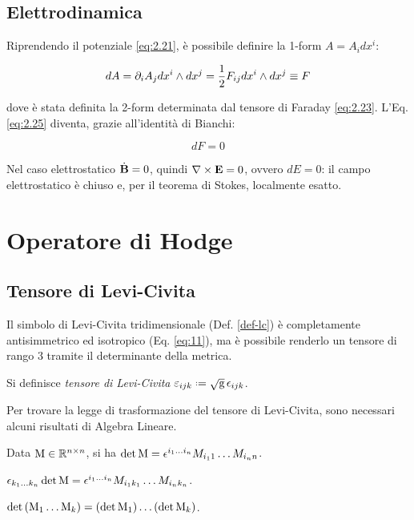 \subsection{Elettrodinamica}

Riprendendo il potenziale \ref{eq:2.21}, è possibile definire la 1-form $ A = A_i dx^i $:

\begin{equation}
	dA = \partial_i A_j dx^i \wedge dx^j = \frac{1}{2} F_{ij} dx^i \wedge dx^j \equiv F
	\label{eq:3.13}
\end{equation}

dove è stata definita la 2-form determinata dal tensore di Faraday \ref{eq:2.23}. L'Eq. \ref{eq:2.25} diventa, grazie all'identità di Bianchi:

\begin{equation}
	dF = 0
	\label{eq:3.14}
\end{equation}

Nel caso elettrostatico $ \dot{\mathbf{B}} = 0 $, quindi $ \nabla\times\mathbf{E} = 0 $, ovvero $ dE = 0 $: il campo elettrostatico è chiuso e, per il teorema di Stokes, localmente esatto.

\section{Operatore di Hodge}

\subsection{Tensore di Levi-Civita}

Il simbolo di Levi-Civita tridimensionale (Def. \ref{def-lc}) è completamente antisimmetrico ed isotropico (Eq. \ref{eq:11}), ma è possibile renderlo un tensore di rango 3 tramite il determinante della metrica.

\begin{definition}
	Si definisce \textit{tensore di Levi-Civita} $ \varepsilon_{ijk} \defeq \sqg \,\epsilon_{ijk} $.
\end{definition}

Per trovare la legge di trasformazione del tensore di Levi-Civita, sono necessari alcuni risultati di Algebra Lineare.

\begin{theorem}[di Laplace]
	Data $ \mathbf{\text{M}}\in\mathbb{R}^{n\times n} $, si ha $ \det\mathbf{\text{M}} = \epsilon^{i_1 \dots i_n} M_{i_1 1} \dots M_{i_n n} $.
\end{theorem}
\begin{corollary}
	$ \epsilon_{k_1 \dots k_n} \det\mathbf{\text{M}} = \epsilon^{i_1 \dots i_n} M_{i_1 k_1} \dots M_{i_n k_n} $.
\end{corollary}
\begin{corollary}\label{cor-lap}
	$ \det \left( \mathbf{\text{M}}_1 \dots \mathbf{\text{M}}_k \right) = \left( \det\mathbf{\text{M}}_1 \right) \dots \left( \det\mathbf{\text{M}}_k \right) $.
\end{corollary}

